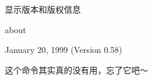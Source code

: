 \label{cmd:about}

显示版本和版权信息

\begin{SACSTX}
about
\end{SACSTX}

January 20, 1999 (Version 0.58)

这个命令其实真的没有用，忘了它吧～
